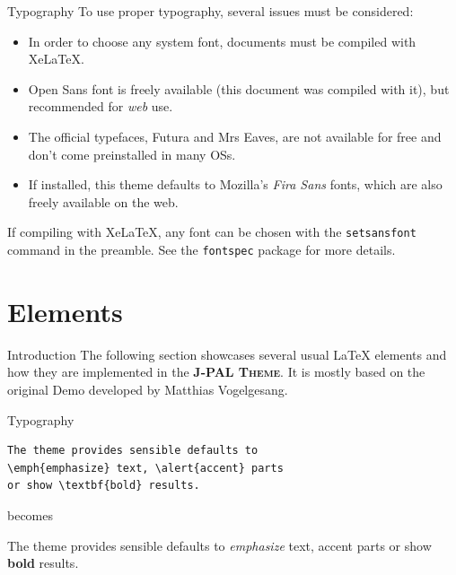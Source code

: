 \documentclass{beamer}
\newcommand{\jpalt}{\textbf{\textsc{J-PAL Theme}}\xspace}
\begin{document}
\begin{frame}{Typography}
To use proper typography, several issues must be considered:
	\begin{itemize}
		\item In order to choose any system font, \alert{documents must be compiled with XeLaTeX}. 
		\item Open Sans font is freely available (this document was compiled with it), but recommended for \emph{web} use.
		\item The official typefaces, Futura and Mrs Eaves, are not available for free and don't come preinstalled in many OSs.
		\item If installed, this theme defaults to Mozilla's \emph{Fira Sans} fonts, which are also freely available on the web.
	\end{itemize}
If compiling with XeLaTeX, any font can be chosen with the \texttt{setsansfont} command in the preamble. See the \texttt{fontspec} package for more details.
\end{frame}


\section{Elements}

\begin{frame}[fragile]{Introduction}
The following section showcases several usual LaTeX elements and how they are implemented in the \jpalt. It is mostly based on the original Demo developed by Matthias Vogelgesang.
\end{frame}

\begin{frame}[fragile]{Typography}
      \begin{verbatim}The theme provides sensible defaults to
\emph{emphasize} text, \alert{accent} parts
or show \textbf{bold} results.\end{verbatim}

  \begin{center}becomes\end{center}

  The theme provides sensible defaults to \emph{emphasize} text,
  \alert{accent} parts or show \textbf{bold} results.
\end{frame}
\end{document}
